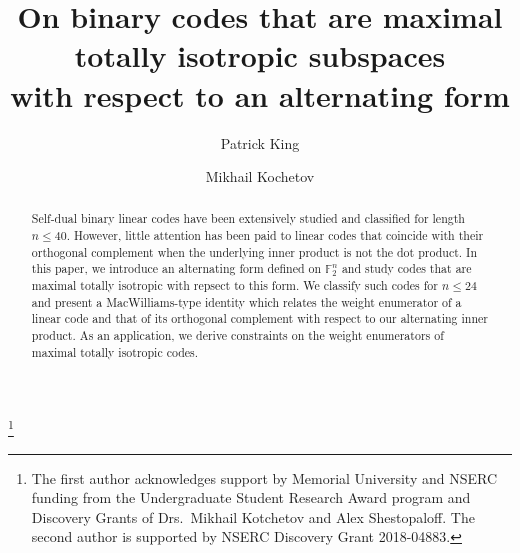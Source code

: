 \documentclass[a4paper,reqno]{amsart}
\theoremstyle{definition}
\theoremstyle{remark} \newtheorem{remark}[theorem]{Remark}
\numberwithin{equation}{section}
\begin{document}
\title[On binary codes that are maximal totally isotropic subspaces]{On binary codes that are maximal\\ totally isotropic subspaces\\ with respect to an alternating form}

\author{Patrick King}

\address{Department of Mathematics, Simon Fraser University, Burnaby, BC, V5A 1S6, Canada}




\thanks{The first author acknowledges support by Memorial University and NSERC funding from the Undergraduate Student Research Award program and Discovery Grants of Drs.~Mikhail Kotchetov and Alex Shestopaloff.
The second author is supported by NSERC Discovery Grant 2018-04883.}

\author{Mikhail Kochetov}

\address{Department of Mathematics and Statistics, Memorial University of Newfoundland, St. John’s, NL, A1C 5S7, Canada}




\begin{abstract}
    Self-dual binary linear codes have been extensively studied and classified for length \(n\leq 40\). However, little attention has been paid to linear codes that coincide with their orthogonal complement when the underlying inner product is not the dot product. In this paper, we introduce an alternating form defined on \(\mathbb{F}_2^n\) and study codes that are maximal totally isotropic with repsect to this form. We classify such codes for \(n\leq 24\) and present a MacWilliams-type identity which relates the weight enumerator of a linear code and that of its orthogonal complement with respect to our alternating inner product. As an application, we derive constraints on the weight enumerators of maximal totally isotropic codes.
\end{abstract}

\maketitle
\end{document}

